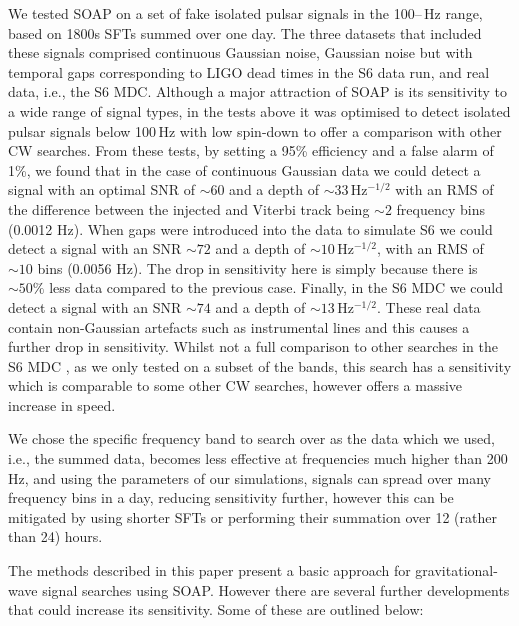 %
%
We tested SOAP on a set of fake isolated pulsar signals in the
100\;--\,Hz range, based on 1800s \acp{SFT} summed over one day.
The three datasets that included these signals comprised continuous Gaussian noise, Gaussian noise but with temporal gaps corresponding to LIGO dead times in the S6 data run, and real data, i.e., the
S6 \ac{MDC}. Although a major attraction of SOAP is its sensitivity to a wide
range of signal types, in the tests above it was optimised to detect isolated pulsar signals below 100\,Hz with low spin-down to offer a comparison with other \ac{CW} searches. From these tests, by setting a
95\% efficiency and a false alarm of 1\%, we found that in the case of  continuous Gaussian data we could detect a signal with an optimal \ac{SNR} of $\sim 60$ and a
depth of $\sim 33$\,Hz$^{-1/2}$ with an \ac{RMS} of the difference between the injected and Viterbi track being $\sim 2$ frequency bins (0.0012 Hz).
When gaps were introduced into the data to simulate S6 we could detect a signal with an
\ac{SNR} $\sim 72$  and a depth of $\sim 10$\,Hz$^{-1/2}$, with an \ac{RMS} of $\sim 10$ bins (0.0056 Hz). The drop in sensitivity here is simply because  there is $\sim 50 \%$ less data compared to the previous case. Finally, in the S6 \ac{MDC} we could
detect a signal with an \ac{SNR} $\sim 74$ and a depth of $\sim
13$\,Hz$^{-1/2}$.
These real data contain non-Gaussian artefacts such as instrumental lines and this causes a further drop in sensitivity.
Whilst not a full comparison to other searches in the S6 \ac{MDC} \citep{walsh2016ComparisonMethods}, as we only tested on a subset
of the bands, this search has a sensitivity which is comparable to some other \ac{CW} searches, however offers a massive increase in speed.

We chose the specific frequency band to search over as the data which we used, i.e., the summed data, becomes less effective at frequencies much higher than 200\,Hz, and using the parameters of our simulations, signals can spread over many frequency bins in a day, reducing sensitivity further, however this can be mitigated by using shorter \acp{SFT} or performing their summation over 12 (rather than 24) hours.

%
%
The methods described in this paper present a basic approach for gravitational-wave signal searches using SOAP. However there are several further developments that could increase its sensitivity. Some of these are outlined below:

